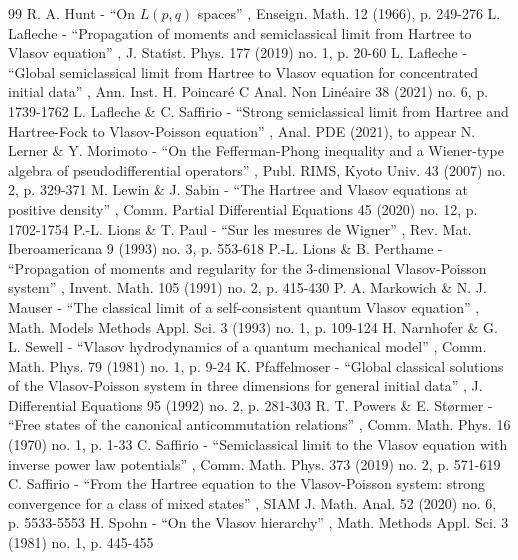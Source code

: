 \documentclass[11pt]{article}
\theoremstyle{definition}
\renewcommand {\(} {\lt(}
\renewcommand {\)} {\rt)}
\begin{document}
\begin{thebibliography}{99}
 R. A. Hunt - “On $L(p,q)$ spaces” , Enseign. Math. 12 (1966), p. 249-276
 L. Lafleche - “Propagation of moments and semiclassical limit from Hartree to Vlasov equation” , J. Statist. Phys. 177 (2019) no. 1, p. 20-60
 L. Lafleche - “Global semiclassical limit from Hartree to Vlasov equation for concentrated initial data” , Ann. Inst. H. Poincaré C Anal. Non Linéaire 38 (2021) no. 6, p. 1739-1762
 L. Lafleche \& C. Saffirio - “Strong semiclassical limit from Hartree and Hartree-Fock to Vlasov-Poisson equation” , Anal. PDE (2021), to appear
 N. Lerner \& Y. Morimoto - “On the Fefferman-Phong inequality and a Wiener-type algebra of pseudodifferential operators” , Publ. RIMS, Kyoto Univ. 43 (2007) no. 2, p. 329-371
 M. Lewin \& J. Sabin - “The Hartree and Vlasov equations at positive density” , Comm. Partial Differential Equations 45 (2020) no. 12, p. 1702-1754
 P.-L. Lions \& T. Paul - “Sur les mesures de Wigner” , Rev. Mat. Iberoamericana 9 (1993) no. 3, p. 553-618
 P.-L. Lions \& B. Perthame - “Propagation of moments and regularity for the 3-dimensional Vlasov-Poisson system” , Invent. Math. 105 (1991) no. 2, p. 415-430
 P. A. Markowich \& N. J. Mauser - “The classical limit of a self-consistent quantum Vlasov equation” , Math. Models Methods Appl. Sci. 3 (1993) no. 1, p. 109-124
 H. Narnhofer \& G. L. Sewell - “Vlasov hydrodynamics of a quantum mechanical model” , Comm. Math. Phys. 79 (1981) no. 1, p. 9-24
 K. Pfaffelmoser - “Global classical solutions of the Vlasov-Poisson system in three dimensions for general initial data” , J. Differential Equations 95 (1992) no. 2, p. 281-303
 R. T. Powers \& E. Størmer - “Free states of the canonical anticommutation relations” , Comm. Math. Phys. 16 (1970) no. 1, p. 1-33
 C. Saffirio - “Semiclassical limit to the Vlasov equation with inverse power law potentials” , Comm. Math. Phys. 373 (2019) no. 2, p. 571-619
 C. Saffirio - “From the Hartree equation to the Vlasov-Poisson system: strong convergence for a class of mixed states” , SIAM J. Math. Anal. 52 (2020) no. 6, p. 5533-5553
 H. Spohn - “On the Vlasov hierarchy” , Math. Methods Appl. Sci. 3 (1981) no. 1, p. 445-455
\end{thebibliography}
\end{document}
